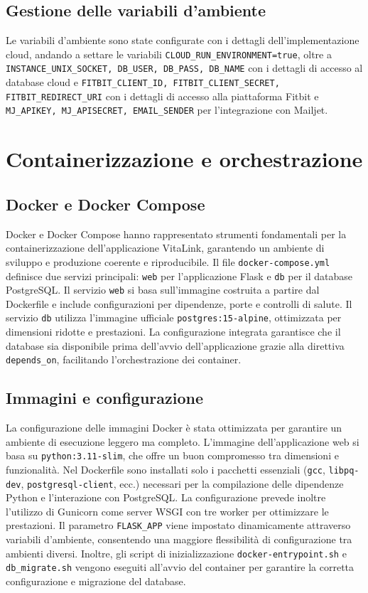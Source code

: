 \documentclass[12pt,a4paper,oneside]{report}
\begin{document}
\subsection{Gestione delle variabili d'ambiente}\sloppy
Le variabili d'ambiente sono state configurate con i dettagli dell'implementazione cloud, andando a settare le variabili \texttt{CLOUD\_RUN\_ENVIRONMENT=true}, oltre a \texttt{INSTANCE\_UNIX\_SOCKET, DB\_USER, DB\_PASS, DB\_NAME}
con i dettagli di accesso al database cloud e \texttt{FITBIT\_CLIENT\_ID, FITBIT\_CLIENT\_SECRET, FITBIT\_REDIRECT\_URI} con i dettagli di accesso alla piattaforma Fitbit e \texttt{MJ\_APIKEY, MJ\_APISECRET, EMAIL\_SENDER} per l'integrazione con Mailjet.
\section{Containerizzazione e orchestrazione}
\subsection{Docker e Docker Compose}
Docker e Docker Compose hanno rappresentato strumenti fondamentali per la containerizzazione dell'applicazione VitaLink, garantendo un ambiente di sviluppo e produzione coerente e riproducibile. Il file \texttt{docker-compose.yml} definisce due servizi principali: \texttt{web} per l'applicazione Flask e \texttt{db} per il database PostgreSQL. Il servizio \texttt{web} si basa sull'immagine costruita a partire dal Dockerfile e include configurazioni per dipendenze, porte e controlli di salute. Il servizio \texttt{db} utilizza l'immagine ufficiale \texttt{postgres:15-alpine}, ottimizzata per dimensioni ridotte e prestazioni. La configurazione integrata garantisce che il database sia disponibile prima dell'avvio dell'applicazione grazie alla direttiva \texttt{depends\_on}, facilitando l'orchestrazione dei container.

\subsection{Immagini e configurazione}
La configurazione delle immagini Docker è stata ottimizzata per garantire un ambiente di esecuzione leggero ma completo. L'immagine dell'applicazione web si basa su \texttt{python:3.11-slim}, che offre un buon compromesso tra dimensioni e funzionalità. Nel Dockerfile sono installati solo i pacchetti essenziali (\texttt{gcc}, \texttt{libpq-dev}, \texttt{postgresql-client}, ecc.) necessari per la compilazione delle dipendenze Python e l'interazione con PostgreSQL. La configurazione prevede inoltre l'utilizzo di Gunicorn come server WSGI con tre worker per ottimizzare le prestazioni. Il parametro \texttt{FLASK\_APP} viene impostato dinamicamente attraverso variabili d'ambiente, consentendo una maggiore flessibilità di configurazione tra ambienti diversi. Inoltre, gli script di inizializzazione \texttt{docker-entrypoint.sh} e \texttt{db\_migrate.sh} vengono eseguiti all'avvio del container per garantire la corretta configurazione e migrazione del database.
\end{document}

